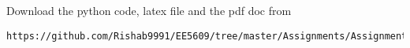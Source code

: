 \documentclass[journal,12pt,twocolumn]{IEEEtran}
\begin{document}
% 
\maketitle
\renewcommand{\theequation}{\arabic{equation}}
%
%
Download the python code, latex file and the pdf doc from
\begin{lstlisting}
https://github.com/Rishab9991/EE5609/tree/master/Assignments/Assignment7
\end{lstlisting}
\end{document}
